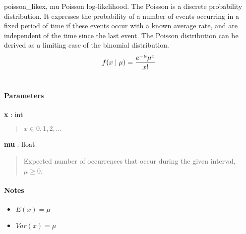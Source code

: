 \hypertarget{pymc.distributions.poisson_like}{}
\begin{funcdesc}{poisson\_like}{x, mu}
Poisson log-likelihood. The Poisson is a discrete probability distribution.
It expresses the probability of a number of events occurring in a fixed
period of time if these events occur with a known average rate, and are
independent of the time since the last event. The Poisson distribution can
be derived as a limiting case of the binomial distribution.
\begin{gather}
\begin{split}f(x \mid \mu) = \frac{e^{-\mu}\mu^x}{x!}\end{split}\notag\\\begin{split}\end{split}\notag
\end{gather}
\paragraph{Parameters}
\begin{paramlist}
\item[]\textbf{x} : int
\begin{quote}

$x \in {0,1,2,...}$
\end{quote}

\item[]\textbf{mu} : float
\begin{quote}

Expected number of occurrences that occur during the given interval,
$\mu \geq 0$.
\end{quote}
\end{paramlist}
\paragraph{Notes}
\begin{itemize}
\item {} 
$E(x)=\mu$

\item {} 
$Var(x)=\mu$

\end{itemize}
\end{funcdesc}

